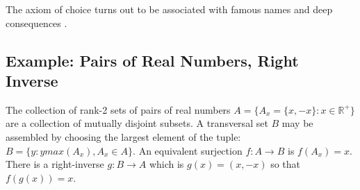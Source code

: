 The axiom of choice turns out to be associated with famous names and deep consequences \cite{stanfordaxiomofchoice}.

\subsection{Example: Pairs of Real Numbers, Right Inverse}
The collection of rank-2 sets of pairs of real numbers $A= \{ A_x = \{x,-x\} : x\in \mathbb{R}^{+}\}$ are a collection of mutually disjoint subsets. A transversal set $B$ may be assembled by choosing the largest element of the tuple: $B = \{y : y max(A_x), A_x \in A \}$. An equivalent surjection $f:A\rightarrow B$ is $f(A_x) = x$. There is a right-inverse $g:B\rightarrow A$ which is $g(x) = (x,-x)$ so that $f(g(x)) = x$.







